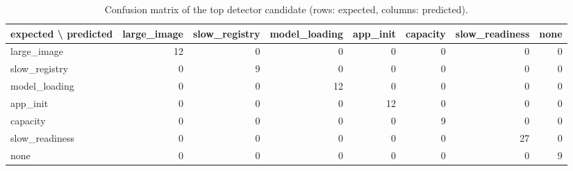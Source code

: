 \begin{table}[t]
\centering\small
\caption{Confusion matrix of the top detector candidate (rows: expected, columns: predicted).}\label{tab:rq1_confusion}
\begin{tabular}{lrrrrrrr}
\toprule
expected \textbackslash{} predicted & large\_image & slow\_registry & model\_loading & app\_init & capacity & slow\_readiness & none \\
\midrule
large\_image & 12 & 0 & 0 & 0 & 0 & 0 & 0 \\
slow\_registry & 0 & 9 & 0 & 0 & 0 & 0 & 0 \\
model\_loading & 0 & 0 & 12 & 0 & 0 & 0 & 0 \\
app\_init & 0 & 0 & 0 & 12 & 0 & 0 & 0 \\
capacity & 0 & 0 & 0 & 0 & 9 & 0 & 0 \\
slow\_readiness & 0 & 0 & 0 & 0 & 0 & 27 & 0 \\
none & 0 & 0 & 0 & 0 & 0 & 0 & 9 \\
\bottomrule
\end{tabular}
\end{table}
